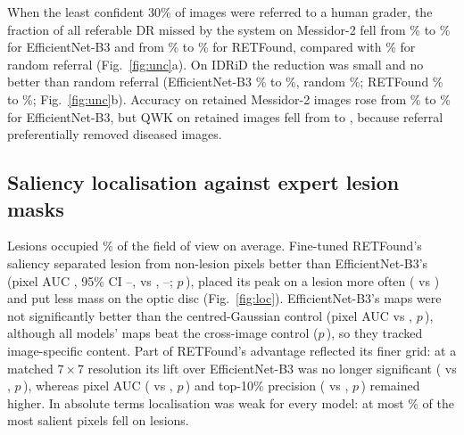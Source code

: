 \documentclass[pdflatex,sn-basic,Numbered]{sn-jnl}
\begin{document}
When the least confident 30\% of images were referred to a human grader, the fraction of all referable DR missed by the system on Messidor-2 fell from \% to \% for EfficientNet-B3 and from \% to \% for RETFound, compared with \% for random referral (Fig.~\ref{fig:unc}a). On IDRiD the reduction was small and no better than random referral (EfficientNet-B3 \% to \%, random \%; RETFound \% to \%; Fig.~\ref{fig:unc}b). Accuracy on retained Messidor-2 images rose from \% to \% for EfficientNet-B3, but QWK on retained images fell from  to , because referral preferentially removed diseased images.



\subsection{Saliency localisation against expert lesion masks}

Lesions occupied \% of the field of view on average. Fine-tuned RETFound's saliency separated lesion from non-lesion pixels better than EfficientNet-B3's (pixel AUC , 95\% CI --, vs , --; $p$\,), placed its peak on a lesion more often ( vs ) and put less mass on the optic disc (Fig.~\ref{fig:loc}). EfficientNet-B3's maps were not significantly better than the centred-Gaussian control (pixel AUC  vs , $p$\,), although all models' maps beat the cross-image control ($p$\,), so they tracked image-specific content. Part of RETFound's advantage reflected its finer grid: at a matched $7\times7$ resolution its lift over EfficientNet-B3 was no longer significant ( vs , $p$\,), whereas pixel AUC ( vs , $p$\,) and top-10\% precision ( vs , $p$\,) remained higher. In absolute terms localisation was weak for every model: at most \% of the most salient pixels fell on lesions.
\end{document}
